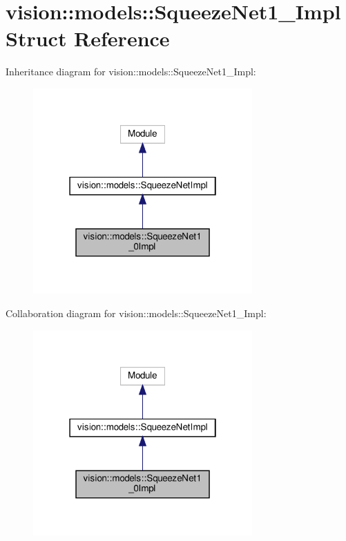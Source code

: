 \hypertarget{structvision_1_1models_1_1SqueezeNet1__0Impl}{}\section{vision\+:\+:models\+:\+:Squeeze\+Net1\+\_\+Impl Struct Reference}
\label{structvision_1_1models_1_1SqueezeNet1__0Impl}


Inheritance diagram for vision\+:\+:models\+:\+:Squeeze\+Net1\+\_\+Impl\+:
\nopagebreak
\begin{figure}[H]
\begin{center}
\leavevmode
\includegraphics[width=238pt]{structvision_1_1models_1_1SqueezeNet1__0Impl__inherit__graph}
\end{center}
\end{figure}


Collaboration diagram for vision\+:\+:models\+:\+:Squeeze\+Net1\+\_\+Impl\+:
\nopagebreak
\begin{figure}[H]
\begin{center}
\leavevmode
\includegraphics[width=238pt]{structvision_1_1models_1_1SqueezeNet1__0Impl__coll__graph}
\end{center}
\end{figure}
